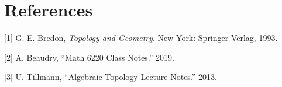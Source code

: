 \documentclass[10pt]{amsart}
\let\subsection\section
\let\section\chapter
\let\chapter\part
\begin{document}
\subsection*{References}

\hypertarget{refs}{}
\leavevmode\hypertarget{ref-Bre93}{}%
{[}1{]} G. E. Bredon, \emph{Topology and Geometry}. New York:
Springer-Verlag, 1993.

\leavevmode\hypertarget{ref-Bea19}{}%
{[}2{]} A. Beaudry, ``Math 6220 Class Notes.'' 2019.

\leavevmode\hypertarget{ref-Til13}{}%
{[}3{]} U. Tillmann, ``Algebraic Topology Lecture Notes.'' 2013.
\end{document}
